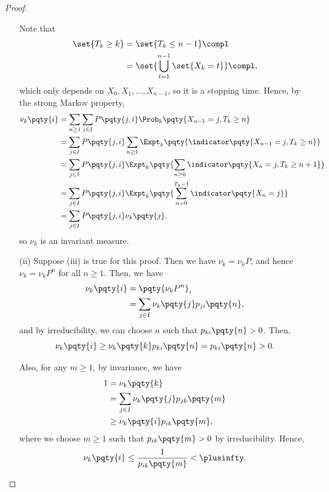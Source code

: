 \begin{proof}
\begin{enumerate}[label=(\roman*)]
        Note that
        \begin{align*}
            \set{T_k \geq k} &= \set{T_k \leq n - 1}\compl \\
            &= \set{\bigcup_{t = 1}^{n - 1} \set{X_k = t}}\compl,
        \end{align*}
        which only depends on \(X_0, X_1, \ldots, X_{n - 1}\), so it is a stopping time. Hence, by the strong Markov property,
        \begin{align*}
            \nu_k \pqty{i} &= \sum_{n \geq 1} \sum_{j \in I} P\pqty{j, i} \Prob_k \pqty{X_{n - 1} = j, T_k \geq n} \\
            &= \sum_{j \in I} P\pqty{j, i} \sum_{n \geq 1} \Expt_k \pqty{\indicator\pqty{X_{n - 1} = j, T_k \geq n}} \\
            &= \sum_{j \in I} P\pqty{j, i} \Expt_k \pqty{\sum_{n \geq 0} \indicator\pqty{X_{n} = j, T_k \geq n + 1}} \\
            &= \sum_{j \in I} P\pqty{j, i} \Expt_k \pqty{\sum_{n = 0}^{T_k - 1} \indicator\pqty{X_n = j}} \\
            &= \sum_{j \in I} P\pqty{j, i} \nu_k \pqty{j}.
        \end{align*}
        so \(\nu_k\) is an invariant measure.
        \item[(ii)] Suppose (iii) is true for this proof. Then we have \(\nu_k = \nu_k P\), and hence \(\nu_k = \nu_k P^n\) for all \(n \geq 1\). Then, we have
        \begin{align*}
            \nu_k \pqty{i} &= \pqty{\nu_k P^n}_i \\
            &= \sum_{j \in I} \nu_k \pqty{j} p_{ji} \pqty{n},
        \end{align*}
        and by irreducibility, we can choose \(n\) such that \(p_{ki} \pqty{n} > 0\). Then,
        \[
            \nu_k \pqty{i} \geq \nu_k \pqty{k} p_{ki} \pqty{n} = p_{ki} \pqty{n} > 0.
        \]

        Also, for any \(m \geq 1\), by invariance, we have
        \begin{align*}
            1 &= \nu_k \pqty{k} \\
            &= \sum_{j \in I} \nu_k \pqty{j} p_{jk} \pqty{m} \\
            &\geq \nu_k \pqty{i} p_{ik} \pqty{m},
        \end{align*}
        where we choose \(m \geq 1\) such that \(p_{ik} \pqty{m} > 0\) by irreducibility. Hence,
        \[
            \nu_k \pqty{i} \leq \frac{1}{p_{ik} \pqty{m}} < \plusinfty.
        \]
    \end{enumerate}
\end{proof}


